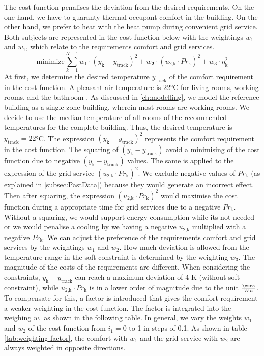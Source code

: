 The cost function penalises the deviation from the desired requirements. On the one hand, we have to guaranty thermal occupant comfort in the building. On the other hand, we prefer to heat with the heat pump during convenient grid service. Both subjects are represented in the cost function below with the weightings $w_\text{1}$ and $w_\text{1}$, which relate to the requirements comfort and grid services.
    \begin{equation}
        \text{minimize} \sum_{k=1}^{N-1} w_\text{1}\cdot (y_\text{k}-y_\text{track})^2 + w_\textbf{2}\cdot(u_\text{2,k}\cdot Pr_\text{k})^2 + w_\text{3} \cdot \eta_\text{k}^2
        \label{eq:costfunctatsächlich}
    \end{equation}
At first, we determine the desired temperature $y_\text{track}$ of the comfort requirement in the cost function. A pleasant air temperature is 22°C for living rooms, working rooms, and the bathroom \cite{Umweltbundesamt.7.10.2021}. As discussed in \autoref{ch:modelling}, we model the reference building as a single-zone building, wherein most rooms are working rooms. We decide to use the median temperature of all rooms of the recommended temperatures for the complete building. Thus, the desired temperature is $y_\text{track} = 22$°C.\newline
The expression $(y_\text{k}-y_\text{track})^2$ represents the comfort requirement in the cost function. The squaring of $(y_\text{k}-y_\text{track})$ avoid a minimising of the cost function due to negative $(y_\text{k}-y_\text{track})$ values. The same is applied to the expression of the grid service $(u_\text{2,k}\cdot Pr_\text{k})^2$. We exclude negative values of $Pr_\text{k}$ (as explained in \autoref{subsec:PastData}) because they would generate an incorrect effect. Then after squaring, the expression $(u_\text{2,k}\cdot Pr_\text{k})^2$ would maximise the cost function during a appropriate time for grid services due to a negative $Pr_\text{k}$. Without a squaring, we would support energy consumption while its not needed or we would penalise a cooling by we having a negative $u_\text{2,k}$ multiplied with a negative $Pr_\text{k}$.\newline
We can adjust the preference of the requirements comfort and grid services by the weightings $w_\text{1}$ and $w_\text{2}$. How much deviation is allowed from the temperature range in the soft constraint is determined by the weighting $w_\text{3}$.\newline
The magnitude of the costs of the requirements are different. When considering the constraints, $y_\text{k}-y_\text{track}$ can reach a maximum deviation of 4 K (without soft constraint), while $u_\text{2,k}\cdot Pr_\text{k}$ is in a lower order of magnitude due to the unit $\frac{\text{\euro}}{Wh}$. To compensate for this, a factor is introduced that gives the comfort requirement a weaker weighting in the cost function. The factor is integrated into the weighing $w_\text{1}$ as shown in the following table. In general, we vary the weights $w_\text{1}$ and $w_\text{2}$ of the cost function from $ i_{1}= 0$ to 1 in steps of 0.1. As shown in table \autoref{tab:weighting factor}, the comfort with $w_\text{1}$ and the grid service with $w_\text{2}$ are always weighted in opposite directions.\newline
